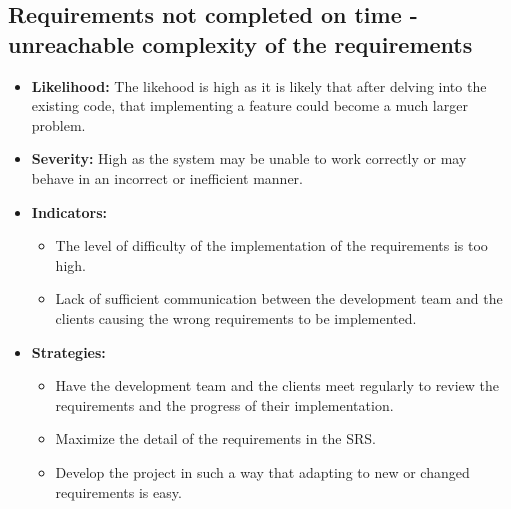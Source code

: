 \documentclass{article}
\begin{document}
\subsection{Requirements not completed on time - unreachable complexity of the requirements}
\begin{itemize}
	\item \textbf{Likelihood:} The likehood is high as it is likely that after delving into the existing code, that implementing a feature could become a much larger problem. 
	\item \textbf{Severity:} High as the system may be unable to work correctly or may behave in an incorrect or inefficient manner.
	\item \textbf{Indicators:} 
		\begin{itemize}
			\item The level of difficulty of the implementation of the requirements is too high.
			\item Lack of sufficient communication between the development team and the clients causing the wrong requirements to be implemented.
		\end{itemize}
	\item \textbf{Strategies:} 
		\begin{itemize}
			\item Have the development team and the clients meet regularly to review the requirements and the progress of their implementation.
			\item Maximize the detail of the requirements in the SRS.
			\item Develop the project in such a way that adapting to new or changed requirements is easy. 
		\end{itemize}
\end{itemize}
\end{document}
